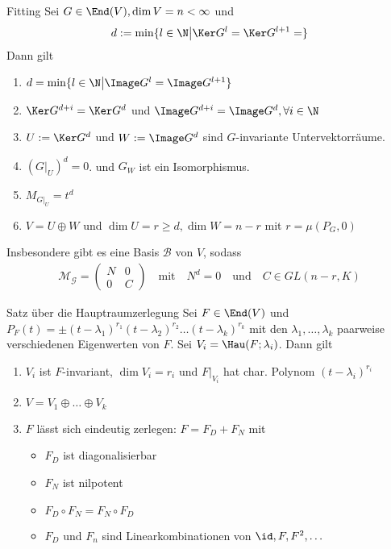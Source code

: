 \begin{lemma}{Fitting}
    Sei $G \in \End(V), \dim V = n < \infty$ und 
    \begin{align*}
        d: = \min\{l \in \N \big\vert \Ker G^l = \Ker G^{l+1} = \}
    \end{align*}
    Dann gilt
    \begin{enumerate}
        \item   $d = \min \{l \in \N \big\vert \Image G^l = \Image G^{l+1}\}$
        \item   $\Ker G^{d+i} = \Ker G^d$ und $\Image G^{d+i} = \Image G^d, \forall i \in \N$
        \item   $U := \Ker G^d$ und $W := \Image G^d$ sind $G$-invariante Untervektorräume.
        \item   $(G|_{U})^d = 0$. und $G_W$ ist ein Isomorphismus.
        \item   $M_{G|_{U}} = t^d$
        \item   $V = U \oplus W$ und $\dim U = r \geq d, \dim W = n - r$ mit $r = \mu(P_G,0)$
    \end{enumerate}
    Insbesondere gibt es eine Basis $\mathcal{B}$ von $V$, sodass
    \begin{align*}
        \mathcal{M}_{\mathcal{G}} = \begin{pmatrix}
            N & 0\\
            0 & C
        \end{pmatrix} \quad \text{mit} \quad N^d = 0 \quad \text{und} \quad C \in GL(n-r,K)
    \end{align*}
\end{lemma}


\begin{nosatz}{Satz über die Hauptraumzerlegung}
    Sei $F \in \End(V)$ und $P_F(t) = \pm (t - \lambda_1)^{r_1} (t - \lambda_2)^{r_2} \dots (t - \lambda_k)^{r_k}$ mit den $\lambda_{1}, \ldots, \lambda_{k}$ paarweise verschiedenen Eigenwerten von $F$. Sei $V_i = \Hau(F;\lambda_i)$. Dann gilt
    \begin{enumerate}
        \item   $V_i$ ist $F$-invariant, $\dim V_i = r_i$ und $F|_{V_i}$ hat char. Polynom $(t - \lambda_i)^{r_i}$
        \item   $V = V_1 \oplus \ldots \oplus V_k$
        \item   $F$ lässt sich eindeutig zerlegen: $F = F_D + F_N$ mit 
        \begin{itemize}
            \item   $F_D$ ist diagonalisierbar
            \item   $F_N$ ist nilpotent
            \item   $F_D \circ F_N = F_N \circ F_D$        
            \item   $F_D$ und $F_n$ sind Linearkombinationen von $\id, F, F^2, \ldots$ 
        \end{itemize}
    \end{enumerate}
\end{nosatz}


